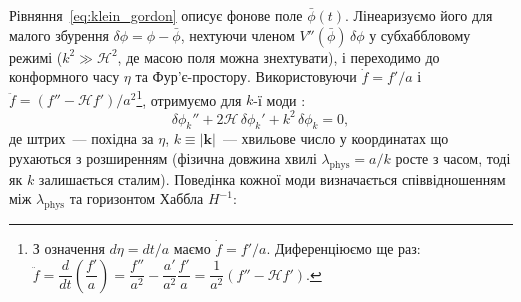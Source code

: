 \documentclass[12pt, a4paper]{article}
\begin{document}
Рівняння~\eqref{eq:klein_gordon} описує фонове поле $\bar{\phi}(t)$.
Лінеаризуємо його для малого збурення $\delta\phi = \phi - \bar{\phi}$,
нехтуючи членом $V''(\bar{\phi})\,\delta\phi$ у субхаббловому режимі
($k^2 \gg \mathcal{H}^2$, де масою поля можна знехтувати), і переходимо
до конформного часу $\eta$ та Фур'є-простору. Використовуючи
$\dot{f} = f'/a$ і $\ddot{f} = (f'' - \mathcal{H}f')/a^2$\footnote{%
З означення $d\eta = dt/a$ маємо $\dot{f} = f'/a$.
Диференціюємо ще раз:
$\ddot{f} = \dfrac{d}{dt}\!\left(\dfrac{f'}{a}\right)
= \dfrac{f''}{a^2} - \dfrac{a'}{a^2}\dfrac{f'}{a}
= \dfrac{1}{a^2}(f'' - \mathcal{H}f')$.},
отримуємо для $k$-ї моди \cite{mukhanov_2005}:
\begin{equation}\label{eq:fourier_field}
  \delta\phi_k'' + 2\mathcal{H}\,\delta\phi_k'
  + k^2\,\delta\phi_k = 0,
\end{equation}
де штрих~--- похідна за $\eta$, $k \equiv |\mathbf{k}|$~---
хвильове число у координатах що рухаються з розширенням
(фізична довжина хвилі $\lambda_\mathrm{phys} = a/k$ росте з часом,
тоді як $k$ залишається сталим). Поведінка кожної моди визначається
співвідношенням між $\lambda_\mathrm{phys}$ та горизонтом Хаббла $H^{-1}$:
\end{document}
